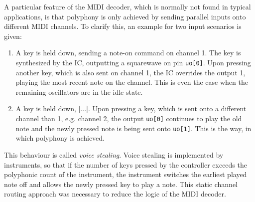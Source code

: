 A particular feature of the \acs{MIDI} decoder, which is normally not found in typical applications, is that polyphony is only achieved by sending parallel inputs onto different \acs{MIDI} channels. To clarify this, an example for two input scenarios is given:

\begin{enumerate}
	\item[\textbf{A}:] A key is held down, sending a note-on command on channel 1. The key is synthesized by the IC, outputting a squarewave on pin \texttt{uo[0]}. Upon pressing another key, which is also sent on channel 1, the \acs{IC} overrides the output 1, playing the most recent note on the channel. This is even the case when the remaining oscillators are in the idle state.
	\item[\textbf{B}:] A key is held down, [...]. Upon pressing a key, which is sent onto a different channel than 1, e.g. channel 2, the output \texttt{uo[0]} continues to play the old note and the newly pressed note is being sent onto \texttt{uo[1]}. This is the way, in which polyphony is achieved.
\end{enumerate}

This behaviour is called \emph{voice stealing}. Voice stealing is implemented by instruments, so that if the number of keys pressed by the controller exceeds the polyphonic count of the instrument, the instrument switches the earliest played note off and allows the newly pressed key to play a note. This static channel routing approach was necessary to reduce the logic of the \acs{MIDI} decoder.
